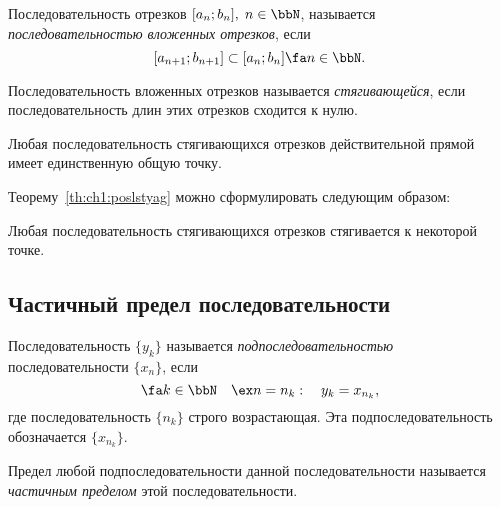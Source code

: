 \begin{defn}
Последовательность отрезков $[a_n;b_n],\; n \in \bbN$, называется \textit{последовательностью вложенных отрезков}, если
$$
[a_{n+1};b_{n+1}]\subset [a_n;b_n] \fa n \in \bbN.
$$
\end{defn}

\begin{defn}
Последовательность вложенных отрезков называется \textit{стягивающейся}, если последовательность длин этих отрезков сходится к нулю.
\end{defn}

\begin{thm}
\label{th:ch1:poslstyag}
Любая последовательность стягивающихся отрезков действительной прямой имеет единственную общую точку.
\end{thm}

Теорему~\ref{th:ch1:poslstyag} можно сформулировать следующим образом: 
\begin{thmn}
Любая последовательность стягивающихся отрезков стягивается к некоторой точке.
\end{thmn}

\subsection{Частичный предел последовательности}
\begin{defn}
Последовательность $\{y_k\}$ называется \textit{подпоследовательностью} последовательности $\{x_n\}$, если 
$$
\fa k \in \bbN \quad \ex n=n_k:\quad y_k=x_{n_k},
$$
где последовательность $\{n_k\}$ строго возрастающая. Эта подпоследовательность обозначается $\{x_{n_k}\}$.
\end{defn}

\begin{defn}
Предел любой подпоследовательности данной последовательности называется \textit{частичным пределом} этой последовательности.
\end{defn}

